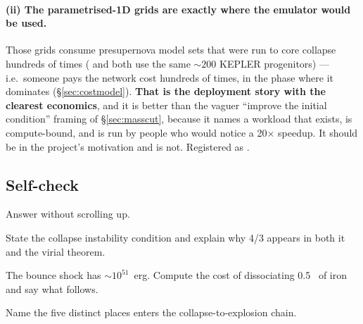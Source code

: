 \paragraph{(ii) The parametrised-1D grids are exactly where the emulator would
be used.} Those grids consume presupernova model sets that were run to core
collapse hundreds of times (\citealt{sukhbold2016} and \citealt{couch2020} both
use the same $\sim 200$ KEPLER progenitors) --- i.e.\ someone pays the network
cost hundreds of times, in the phase where it dominates
(\S\ref{sec:costmodel}). \textbf{That is the deployment story with the clearest
economics}, and it is better than the vaguer ``improve the initial condition''
framing of \S\ref{sec:masscut}, because it names a workload that exists, is
compute-bound, and is run by people who would notice a 20$\times$ speedup. It
should be in the project's motivation and is not. Registered as .

\subsection{Self-check}
\label{sec:selfcheck-collapse}

Answer without scrolling up.

\begin{selfcheck}
\item State the collapse instability condition and explain why 4/3 appears in
  both it and the virial theorem.
\item The bounce shock has $\sim 10^{51}$~erg. Compute the cost of dissociating
  0.5~\Msun{} of iron and say what follows.
\item Name the five distinct places \Ye{} enters the collapse-to-explosion
  chain.
\end{selfcheck}
